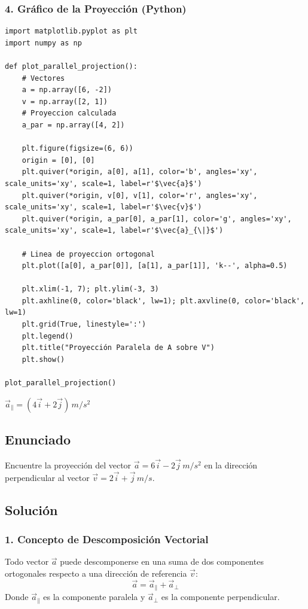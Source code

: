 \documentclass[12pt, a4paper]{article}
\begin{document}
\subsubsection*{4. Gráfico de la Proyección (Python)}
\begin{lstlisting}
import matplotlib.pyplot as plt
import numpy as np

def plot_parallel_projection():
    # Vectores
    a = np.array([6, -2])
    v = np.array([2, 1])
    # Proyeccion calculada
    a_par = np.array([4, 2])
    
    plt.figure(figsize=(6, 6))
    origin = [0], [0]
    plt.quiver(*origin, a[0], a[1], color='b', angles='xy', scale_units='xy', scale=1, label=r'$\vec{a}$')
    plt.quiver(*origin, v[0], v[1], color='r', angles='xy', scale_units='xy', scale=1, label=r'$\vec{v}$')
    plt.quiver(*origin, a_par[0], a_par[1], color='g', angles='xy', scale_units='xy', scale=1, label=r'$\vec{a}_{\|}$')
    
    # Linea de proyeccion ortogonal
    plt.plot([a[0], a_par[0]], [a[1], a_par[1]], 'k--', alpha=0.5)
    
    plt.xlim(-1, 7); plt.ylim(-3, 3)
    plt.axhline(0, color='black', lw=1); plt.axvline(0, color='black', lw=1)
    plt.grid(True, linestyle=':')
    plt.legend()
    plt.title("Proyección Paralela de A sobre V")
    plt.show()

plot_parallel_projection()
\end{lstlisting}

\begin{tcolorbox}[colback=green!5!white, colframe=green!50!black, title=Respuesta Final]
\centering \Large $\vec{a}_{\|} = (4\vec{i} + 2\vec{j}) \, \si{m/s^2}$
\end{tcolorbox}

\newpage

\subsection*{Enunciado}
Encuentre la proyección del vector $\vec{a} = 6\vec{i} - 2\vec{j} \, \si{m/s^2}$ en la dirección perpendicular al vector $\vec{v} = 2\vec{i} + \vec{j} \, \si{m/s}$.

\subsection*{Solución}

\subsubsection*{1. Concepto de Descomposición Vectorial}
Todo vector $\vec{a}$ puede descomponerse en una suma de dos componentes ortogonales respecto a una dirección de referencia $\vec{v}$:
\begin{equation*}
    \vec{a} = \vec{a}_{\|} + \vec{a}_{\perp}
\end{equation*}
Donde $\vec{a}_{\|}$ es la componente paralela y $\vec{a}_{\perp}$ es la componente perpendicular.
\end{document}

